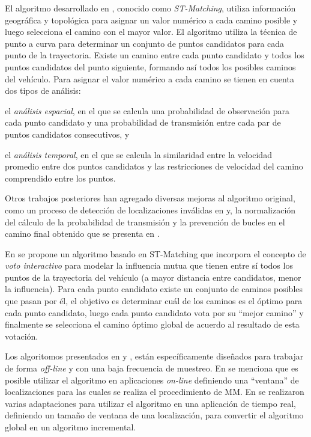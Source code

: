 El algoritmo desarrollado en \citep{lou2009map}, conocido como \emph{ST-Matching}, utiliza información geográfica y topológica para asignar un valor numérico a cada camino posible y luego selecciona el camino con el mayor valor. El algoritmo utiliza la técnica de punto a curva para determinar un conjunto de puntos candidatos para cada punto de la trayectoria. Existe un camino entre cada punto candidato y todos los puntos candidatos del punto siguiente, formando así todos los posibles caminos del vehículo. Para asignar el valor numérico a cada camino se tienen en cuenta dos tipos de análisis: \begin{enumerate*}[a)] \item el \emph{análisis espacial}, en el que se calcula una probabilidad de observación para cada punto candidato y una probabilidad de transmisión entre cada par de puntos candidatos consecutivos, y \item el \emph{análisis temporal}, en el que se calcula la similaridad entre la velocidad promedio entre dos puntos candidatos y las restricciones de velocidad del camino comprendido entre los puntos.\end{enumerate*} Otros trabajos posteriores han agregado diversas mejoras al algoritmo original, como un proceso de detección de localizaciones inválidas en  \citep{sakic2012map} y, la normalización del cálculo de la probabilidad de transmisión y la prevención de bucles en el camino final obtenido que se presenta en  \citep{budigm2012algorithm}.

En \citep{yuan2010interactive} se propone un algoritmo basado en ST-Matching que incorpora el concepto de \emph{voto interactivo} para modelar la influencia mutua que tienen entre sí todos los puntos de la trayectoria del vehículo (a mayor distancia entre candidatos, menor la influencia). Para cada punto candidato existe un conjunto de caminos posibles que pasan por él, el objetivo es determinar cuál de los caminos es el óptimo para cada punto candidato, luego cada punto candidato vota por su “mejor camino” y finalmente se selecciona el camino óptimo global de acuerdo al resultado de esta votación.

Los algoritomos presentados en \citep{lou2009map} y \citep{yuan2010interactive}, están específicamente diseñados para trabajar de forma \emph{off-line} y con una baja frecuencia de muestreo. En \citep{lou2009map} se  menciona que es posible utilizar el algoritmo en aplicaciones \emph{on-line} definiendo una “ventana” de localizaciones para las cuales se realiza el procedimiento de MM. En \citep{sakic2012map} se realizaron varias adaptaciones para utilizar el algoritmo en una aplicación de tiempo real, definiendo un tamaño de ventana de una localización, para convertir el algoritmo global en un algoritmo incremental.

